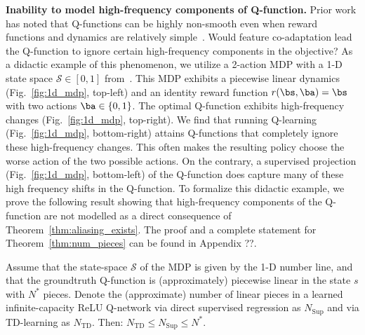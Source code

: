 \textbf{Inability to model high-frequency components of Q-function.} Prior work has noted that Q-functions can be highly non-smooth even when reward functions and dynamics are relatively simple~\citep{dong2020expressivity}.
Would feature co-adaptation lead the Q-function to ignore certain high-frequency components in the objective?
As a didactic example of this phenomenon, we utilize a 2-action MDP with a 1-D state space $\mathcal{S} \in [0, 1]$ from~\citep{dong2020expressivity}. This MDP exhibits a piecewise linear dynamics (Fig.~\ref{fig:1d_mdp}, top-left) and an identity reward function $r(\bs, \ba) = \bs$ with two actions $\ba \in \{0, 1\}$. The optimal Q-function exhibits high-frequency changes (Fig.~\ref{fig:1d_mdp}, top-right). We find that running Q-learning (Fig.~\ref{fig:1d_mdp}, bottom-right)
attains Q-functions that completely ignore these high-frequency changes. This often makes the resulting policy choose the worse action of the two possible actions. On the contrary, a supervised projection (Fig.~\ref{fig:1d_mdp}, bottom-left) of the Q-function does capture many of these high frequency shifts in the Q-function. To formalize this didactic example, we prove the following result showing that high-frequency components of the Q-function are not modelled as a direct consequence of Theorem~\ref{thm:aliasing_exists}. The proof and a complete statement for Theorem~\ref{thm:num_pieces} can be found in Appendix ??.

\begin{theorem}[Informal]
Assume that the state-space $\mathcal{S}$ of the MDP is given by the 1-D number line, and that the groundtruth Q-function is (approximately) piecewise linear in the state $s$ with $N^*$ pieces. Denote the (approximate) number of linear pieces in a learned infinite-capacity ReLU Q-network via direct supervised regression as $N_{\mathrm{Sup}}$ and via TD-learning as $N_{\mathrm{TD}}$. Then: $N_{\mathrm{TD}} \leq N_{\mathrm{Sup}} \leq N^*$.     
\label{thm:num_pieces}
\end{theorem}

